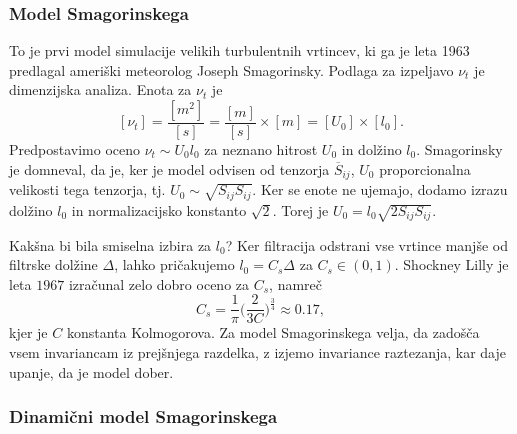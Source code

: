 \documentclass[mat2, tisk]{fmfdelo}
\begin{document}
\subsubsection{Model Smagorinskega} 

To je prvi model simulacije velikih turbulentnih vrtincev, ki 
ga je leta 1963 predlagal ameriški meteorolog Joseph Smagorinsky.
Podlaga za izpeljavo $\nu_t$ je dimenzijska analiza. Enota za $\nu_t$ je
$$
[\nu_t] = \frac{[m^2]}{[s]} = \frac{[m]}{[s]} \times [m] = [U_0] \times [l_0].
$$
Predpostavimo oceno $\nu_t \sim U_0 l_0$ za neznano hitrost $U_0$ in dolžino $l_0$.
Smagorinsky je domneval, da je, ker je model odvisen od tenzorja $\overline{S}_{ij}$, 
$U_0$ proporcionalna velikosti tega tenzorja, tj. $U_0 \sim \sqrt{S_{ij} S_{ij}}$.
Ker se enote ne ujemajo, dodamo izrazu dolžino $l_0$ in normalizacijsko konstanto $\sqrt{2}$.
Torej je $U_0 = l_0\sqrt{2 S_{ij} S_{ij}}$. 

Kakšna bi bila smiselna izbira za $l_0$? Ker filtracija 
odstrani vse vrtince manjše od filtrske dolžine $\Delta$, lahko 
pričakujemo $l_0 = C_s \Delta$ za $C_s\in (0, 1)$. Shockney Lilly je leta $1967$
izračunal zelo dobro oceno za $C_s$, namreč
$$
C_s = \frac{1}{\pi} \Big(\frac{2}{3C}\Big)^\frac{3}{4} \approx 0.17,
$$
kjer je $C$ konstanta Kolmogorova.
Za model Smagorinskega velja, da zadošča vsem invariancam iz prejšnjega razdelka,
z izjemo invariance raztezanja, kar daje upanje, da je model dober. 

\subsubsection{Dinamični model Smagorinskega}
\end{document}
